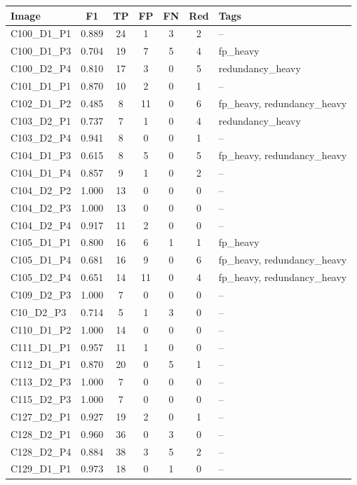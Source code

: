 {\scriptsize
\setlength{\tabcolsep}{4pt}
\begin{tabular}{p{2.6cm}ccccc p{4.8cm}}
\toprule
Image & F1 & TP & FP & FN & Red & Tags \\
\midrule
 C100\_D1\_P1 & 0.889 & 24 & 1 & 3 & 2 & -- \\
 C100\_D1\_P3 & 0.704 & 19 & 7 & 5 & 4 & fp\_heavy \\
 C100\_D2\_P4 & 0.810 & 17 & 3 & 0 & 5 & redundancy\_heavy \\
 C101\_D1\_P1 & 0.870 & 10 & 2 & 0 & 1 & -- \\
 C102\_D1\_P2 & 0.485 & 8 & 11 & 0 & 6 & fp\_heavy, redundancy\_heavy \\
 C103\_D2\_P1 & 0.737 & 7 & 1 & 0 & 4 & redundancy\_heavy \\
 C103\_D2\_P4 & 0.941 & 8 & 0 & 0 & 1 & -- \\
 C104\_D1\_P3 & 0.615 & 8 & 5 & 0 & 5 & fp\_heavy, redundancy\_heavy \\
 C104\_D1\_P4 & 0.857 & 9 & 1 & 0 & 2 & -- \\
 C104\_D2\_P2 & 1.000 & 13 & 0 & 0 & 0 & -- \\
 C104\_D2\_P3 & 1.000 & 13 & 0 & 0 & 0 & -- \\
 C104\_D2\_P4 & 0.917 & 11 & 2 & 0 & 0 & -- \\
 C105\_D1\_P1 & 0.800 & 16 & 6 & 1 & 1 & fp\_heavy \\
 C105\_D1\_P4 & 0.681 & 16 & 9 & 0 & 6 & fp\_heavy, redundancy\_heavy \\
 C105\_D2\_P4 & 0.651 & 14 & 11 & 0 & 4 & fp\_heavy, redundancy\_heavy \\
 C109\_D2\_P3 & 1.000 & 7 & 0 & 0 & 0 & -- \\
 C10\_D2\_P3 & 0.714 & 5 & 1 & 3 & 0 & -- \\
 C110\_D1\_P2 & 1.000 & 14 & 0 & 0 & 0 & -- \\
 C111\_D1\_P1 & 0.957 & 11 & 1 & 0 & 0 & -- \\
 C112\_D1\_P1 & 0.870 & 20 & 0 & 5 & 1 & -- \\
 C113\_D2\_P3 & 1.000 & 7 & 0 & 0 & 0 & -- \\
 C115\_D2\_P3 & 1.000 & 7 & 0 & 0 & 0 & -- \\
 C127\_D2\_P1 & 0.927 & 19 & 2 & 0 & 1 & -- \\
 C128\_D2\_P1 & 0.960 & 36 & 0 & 3 & 0 & -- \\
 C128\_D2\_P4 & 0.884 & 38 & 3 & 5 & 2 & -- \\
 C129\_D1\_P1 & 0.973 & 18 & 0 & 1 & 0 & -- \\

\end{tabular}}
